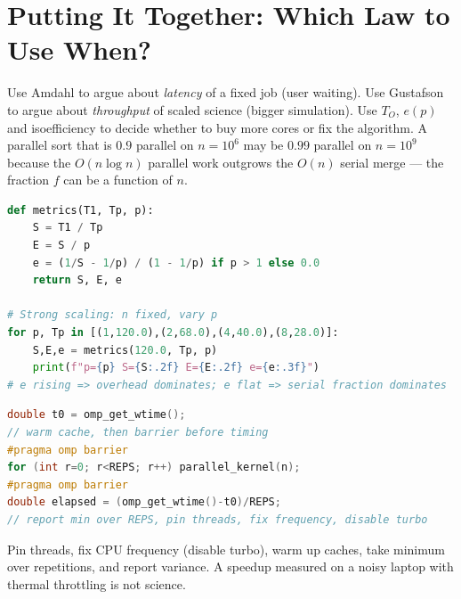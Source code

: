 \section{Putting It Together: Which Law to Use When?}
Use Amdahl to argue about \emph{latency} of a fixed job (user waiting). Use Gustafson to argue about \emph{throughput} of scaled science (bigger simulation). Use $T_{O}$, $e(p)$ and isoefficiency to decide whether to buy more cores or fix the algorithm. A parallel sort that is $0.9$ parallel on $n=10^{6}$ may be $0.99$ parallel on $n=10^{9}$ because the $O(n\log n)$ parallel work outgrows the $O(n)$ serial merge --- the fraction $f$ can be a function of $n$.

\begin{lstlisting}[language=Python, caption={Speedup, efficiency, and Karp--Flatt from measurements}, label={lst:speedup}]
def metrics(T1, Tp, p):
    S = T1 / Tp
    E = S / p
    e = (1/S - 1/p) / (1 - 1/p) if p > 1 else 0.0
    return S, E, e

# Strong scaling: n fixed, vary p
for p, Tp in [(1,120.0),(2,68.0),(4,40.0),(8,28.0)]:
    S,E,e = metrics(120.0, Tp, p)
    print(f"p={p} S={S:.2f} E={E:.2f} e={e:.3f}")
# e rising => overhead dominates; e flat => serial fraction dominates
\end{lstlisting}

\begin{lstlisting}[language=C, caption={Micro-benchmark skeleton for timing $T_{p}$ correctly}, label={lst:timing}]
double t0 = omp_get_wtime();
// warm cache, then barrier before timing
#pragma omp barrier
for (int r=0; r<REPS; r++) parallel_kernel(n);
#pragma omp barrier
double elapsed = (omp_get_wtime()-t0)/REPS;
// report min over REPS, pin threads, fix frequency, disable turbo
\end{lstlisting}

\begin{remark}
Pin threads, fix CPU frequency (disable turbo), warm up caches, take minimum over repetitions, and report variance. A speedup measured on a noisy laptop with thermal throttling is not science.
\end{remark}

